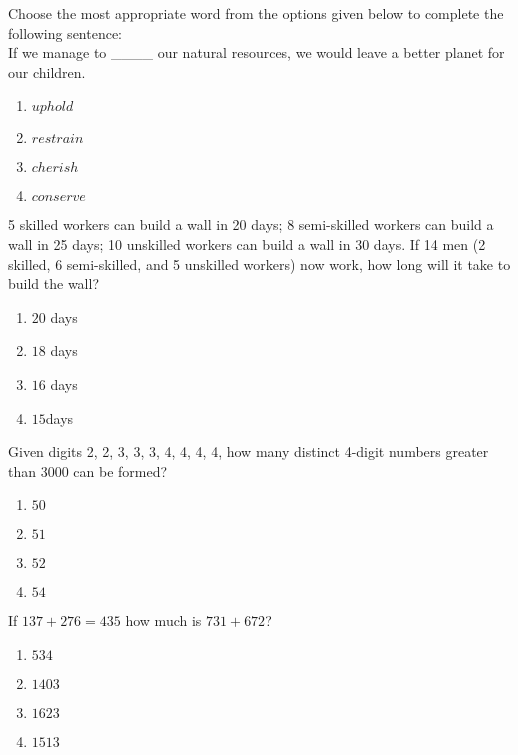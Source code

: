     \item Choose the most appropriate word from the options given below to complete the following sentence: \\
    {If we manage to \_\_\_\_ our natural resources, we would leave a better planet for our children.}
    \begin{enumerate}
        \item $  {uphold} $
        \item $  {restrain} $
        \item $  {cherish} $
        \item $  {conserve} $
    \end{enumerate}

    \item 5 skilled workers can build a wall in 20 days; 8 semi-skilled workers can build a wall in 25 days; 10 unskilled workers can build a wall in 30 days. If 14 men (2 skilled, 6 semi-skilled, and 5 unskilled workers) now work, how long will it take to build the wall?
    \begin{enumerate}
        \item $  20 $ days 
        \item $  18 $ days 
        \item $  16$  days 
        \item $  15$days 
    \end{enumerate}

    \item Given digits 2, 2, 3, 3, 3, 4, 4, 4, 4, how many distinct 4-digit numbers greater than 3000 can be formed?
    \begin{enumerate}
        \item $  50 $
        \item $  51 $
        \item $ 52 $
        \item $ 54 $
    \end{enumerate}
\item If $137 + 276 = 435$ how much is $731 + 672$?
\begin{enumerate}
    \item $534$
    \item $1403$
    \item $1623$
    \item $1513$
\end{enumerate}

